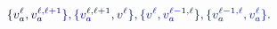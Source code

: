 \documentclass[12pt]{article}
\begin{document}
\makeatletter
\renewcommand*{\@textcolor}[3]{%
  \protect\leavevmode
  \begingroup
    \color#1{#2}#3%
  \endgroup
}
\makeatother
\begin{displaymath}
\mathcolor[RGB]{0,0,15}{\{} \mathcolor[RGB]{0,0,30}{v} _ { \mathcolor[RGB]{0,0,45}{a} } ^ { \mathcolor[RGB]{0,0,60}{\ell} } \mathcolor[RGB]{0,0,75}{,} \mathcolor[RGB]{0,0,90}{v} _ { \mathcolor[RGB]{0,0,105}{a} } ^ { \mathcolor[RGB]{0,0,120}{\ell} \mathcolor[RGB]{0,0,135}{,} \mathcolor[RGB]{0,0,150}{\ell} \mathcolor[RGB]{0,0,165}{+} \mathcolor[RGB]{0,0,180}{1} } \mathcolor[RGB]{0,0,195}{\}} \mathcolor[RGB]{0,0,210}{,} \mathcolor[RGB]{0,0,225}{\{} \mathcolor[RGB]{0,0,240}{v} _ { \mathcolor[RGB]{0,0,255}{a} } ^ { \mathcolor[RGB]{0,15,0}{\ell} \mathcolor[RGB]{0,15,15}{,} \mathcolor[RGB]{0,15,30}{\ell} \mathcolor[RGB]{0,15,45}{+} \mathcolor[RGB]{0,15,60}{1} } \mathcolor[RGB]{0,15,75}{,} \mathcolor[RGB]{0,15,90}{v} ^ { \mathcolor[RGB]{0,15,105}{\ell} } \mathcolor[RGB]{0,15,120}{\}} \mathcolor[RGB]{0,15,135}{,} \mathcolor[RGB]{0,15,150}{\{} \mathcolor[RGB]{0,15,165}{v} ^ { \mathcolor[RGB]{0,15,180}{\ell} } \mathcolor[RGB]{0,15,195}{,} \mathcolor[RGB]{0,15,210}{v} _ { \mathcolor[RGB]{0,15,225}{a} } ^ { \mathcolor[RGB]{0,15,240}{\ell} \mathcolor[RGB]{0,15,255}{-} \mathcolor[RGB]{0,30,0}{1} \mathcolor[RGB]{0,30,15}{,} \mathcolor[RGB]{0,30,30}{\ell} } \mathcolor[RGB]{0,30,45}{\}} \mathcolor[RGB]{0,30,60}{,} \mathcolor[RGB]{0,30,75}{\{} \mathcolor[RGB]{0,30,90}{v} _ { \mathcolor[RGB]{0,30,105}{a} } ^ { \mathcolor[RGB]{0,30,120}{\ell} \mathcolor[RGB]{0,30,135}{-} \mathcolor[RGB]{0,30,150}{1} \mathcolor[RGB]{0,30,165}{,} \mathcolor[RGB]{0,30,180}{\ell} } \mathcolor[RGB]{0,30,195}{,} \mathcolor[RGB]{0,30,210}{v} _ { \mathcolor[RGB]{0,30,225}{a} } ^ { \mathcolor[RGB]{0,30,240}{\ell} } \mathcolor[RGB]{0,30,255}{\}} \mathcolor[RGB]{0,45,0}{.}
\end{displaymath}
\end{document}
